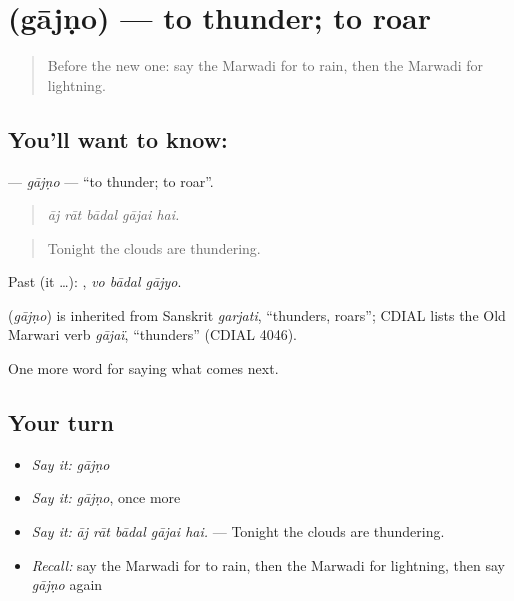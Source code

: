 \section[\texorpdfstring{\mw{गाजणो} (gājṇo)}{गाजणो (gājṇo)}]{ (gājṇo) — to thunder; to roar}

\label{lesson:MW-C221-gajno}



\begin{quote}
Before the new one: say the Marwadi for to rain, then the Marwadi for lightning.
\end{quote}

\subsection*{You'll want to know: }
\textbf{} — \emph{gājṇo} — \textquotedblleft{}to thunder; to roar\textquotedblright{}.

\begin{quote}
    
\end{quote}

\begin{quote}
\emph{āj rāt bādal gājai hai.}
\end{quote}

\begin{quote}
Tonight the clouds are thundering.
\end{quote}

Past (it …):   , \emph{vo bādal gājyo}.

\begin{cousinweb}
\textbf{} (\emph{gājṇo}) is inherited from Sanskrit \emph{garjati}, \textquotedblleft{}thunders, roars\textquotedblright{}; CDIAL lists the Old Marwari verb \emph{gājaï}, \textquotedblleft{}thunders\textquotedblright{} (CDIAL 4046).
\end{cousinweb}

\begin{grammarlens}[title={What you've built}]
One more word for saying what comes next.
\end{grammarlens}

\subsection*{Your turn}
\begin{itemize}
\raggedright
  \item \emph{Say it:} \emph{gājṇo}
  \item \emph{Say it:} \emph{gājṇo}, once more
  \item \emph{Say it:} \emph{āj rāt bādal gājai hai.} — Tonight the clouds are thundering.
  \item \emph{Recall:} say the Marwadi for to rain, then the Marwadi for lightning, then say \emph{gājṇo} again
\end{itemize}

